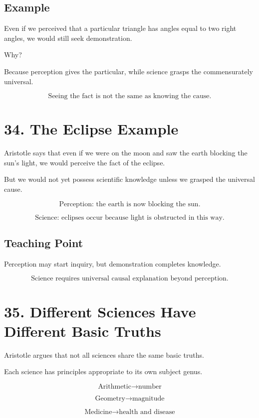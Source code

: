 \documentclass[12pt]{article}
\begin{document}
\subsection*{Example}

Even if we perceived that a particular triangle has angles equal to two right
angles, we would still seek demonstration.

Why?

Because perception gives the particular, while science grasps the
commensurately universal.

\[
\boxed{
\text{Seeing the fact is not the same as knowing the cause.}
}
\]

\section*{34. The Eclipse Example}

Aristotle says that even if we were on the moon and saw the earth blocking the
sun's light, we would perceive the fact of the eclipse.

But we would not yet possess scientific knowledge unless we grasped the
universal cause.

\[
\text{Perception: the earth is now blocking the sun.}
\]

\[
\text{Science: eclipses occur because light is obstructed in this way.}
\]

\subsection*{Teaching Point}

Perception may start inquiry, but demonstration completes knowledge.

\[
\boxed{
\text{Science requires universal causal explanation beyond perception.}
}
\]

\section*{35. Different Sciences Have Different Basic Truths}

Aristotle argues that not all sciences share the same basic truths.

Each science has principles appropriate to its own subject genus.

\[
\text{Arithmetic} \rightarrow \text{number}
\]

\[
\text{Geometry} \rightarrow \text{magnitude}
\]

\[
\text{Medicine} \rightarrow \text{health and disease}
\]
\end{document}

